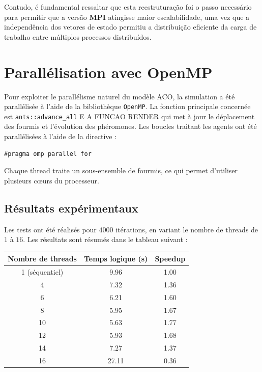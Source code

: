 \documentclass[11pt]{article}
\begin{document}
Contudo, é fundamental ressaltar que esta reestruturação foi o passo necessário para permitir que a versão \textbf{MPI} atingisse maior escalabilidade, uma vez que a independência dos vetores de estado permitiu a distribuição eficiente da carga de trabalho entre múltiplos processos distribuídos.

\section{Parallélisation avec OpenMP}

Pour exploiter le parallélisme naturel du modèle ACO, la simulation a été parallélisée à l'aide de la bibliothèque \texttt{OpenMP}. La fonction principale concernée est \texttt{ants::advance\_all} E A FUNCAO RENDER qui met à jour le déplacement des fourmis et l'évolution des phéromones. Les boucles traitant les agents ont été parallélisées à l'aide de la directive :

\begin{verbatim}
#pragma omp parallel for
\end{verbatim}

Chaque thread traite un sous-ensemble de fourmis, ce qui permet d'utiliser plusieurs cœurs du processeur.

\subsection{Résultats expérimentaux}

Les tests ont été réalisés pour $4000$ itérations, en variant le nombre de threads de $1$ à $16$. Les résultats sont résumés dans le tableau suivant :

\begin{center}
\begin{tabular}{ccc}
\toprule
Nombre de threads & Temps logique (s) & Speedup \\
\midrule
1 (séquentiel) & 9.96 & 1.00 \\
4 & 7.32 & 1.36 \\
6 & 6.21 & 1.60 \\
8 & 5.95 & 1.67 \\
10 & 5.63 & 1.77 \\
12 & 5.93 & 1.68 \\
14 & 7.27 & 1.37 \\
16 & 27.11 & 0.36 \\
\bottomrule
\end{tabular}
\end{center}
\end{document}
